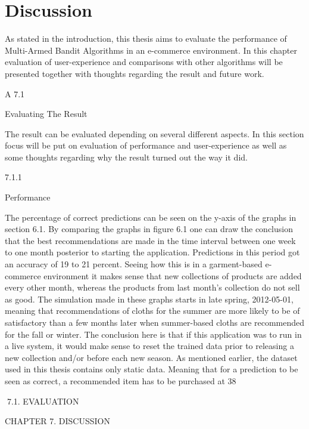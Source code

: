 \chapter{Discussion}
As stated in the introduction, this thesis aims to evaluate the performance
of Multi-Armed Bandit Algorithms in an e-commerce environment. In this
chapter evaluation of user-experience and comparisons with other algorithms
will be presented together with thoughts regarding the result and future work.

A
7.1

Evaluating The Result

The result can be evaluated depending on several different aspects. In this section focus
will be put on evaluation of performance and user-experience as well as some thoughts
regarding why the result turned out the way it did.

7.1.1

Performance

The percentage of correct predictions can be seen on the y-axis of the graphs in section
6.1. By comparing the graphs in figure 6.1 one can draw the conclusion that the best
recommendations are made in the time interval between one week to one month posterior to starting the application. Predictions in this period got an accuracy of 19 to 21
percent. Seeing how this is in a garment-based e-commerce environment it makes sense
that new collections of products are added every other month, whereas the products from
last month’s collection do not sell as good. The simulation made in these graphs starts
in late spring, 2012-05-01, meaning that recommendations of cloths for the summer are
more likely to be of satisfactory than a few months later when summer-based cloths are
recommended for the fall or winter. The conclusion here is that if this application was
to run in a live system, it would make sense to reset the trained data prior to releasing
a new collection and/or before each new season.
As mentioned earlier, the dataset used in this thesis contains only static data. Meaning
that for a prediction to be seen as correct, a recommended item has to be purchased at
38

7.1. EVALUATION

CHAPTER 7. DISCUSSION

